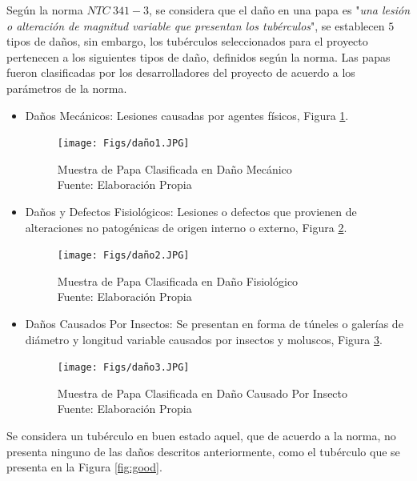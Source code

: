 Según la norma $NTC \ 341-3$, se considera que el daño en una papa es "\textit{una lesión o alteración de magnitud variable que presentan los tubérculos}", se establecen $5$ tipos de daños, sin embargo, los tubérculos seleccionados para el proyecto pertenecen a los siguientes tipos de daño, definidos según la norma. Las papas fueron clasificadas por los desarrolladores del proyecto de acuerdo a los parámetros de la norma.

\begin{itemize}
	\item Daños Mecánicos: Lesiones causadas por agentes físicos, Figura \ref{fig:dano1}.
	
	\begin{figure}[ht]
		\centering
		\texttt{[image: Figs/daño1.JPG]}
		\caption{Muestra de Papa Clasificada en Daño Mecánico \\ Fuente: Elaboración Propia}
		\label{fig:dano1}
	\end{figure}
		
	\item Daños y Defectos Fisiológicos: Lesiones o defectos que provienen de alteraciones no patogénicas de origen interno o externo, Figura \ref{fig:dano2}.
	
	\begin{figure}[ht]
		\centering
		\texttt{[image: Figs/daño2.JPG]}
		\caption{Muestra de Papa Clasificada en Daño Fisiológico \\ Fuente: Elaboración Propia}
		\label{fig:dano2}
	\end{figure}

	\item Daños Causados Por Insectos: Se presentan en forma de túneles o galerías de diámetro y longitud variable causados por insectos y moluscos, Figura \ref{fig:dano3}.
	
	\begin{figure}[ht]
		\centering
		\texttt{[image: Figs/daño3.JPG]}
		\caption{Muestra de Papa Clasificada en Daño Causado Por Insecto \\ Fuente: Elaboración Propia}
		\label{fig:dano3}
	\end{figure}
\end{itemize}

Se considera un tubérculo en buen estado aquel, que de acuerdo a la norma, no presenta ninguno de las daños descritos anteriormente, como el tubérculo que se presenta en la Figura \ref{fig:good}.

